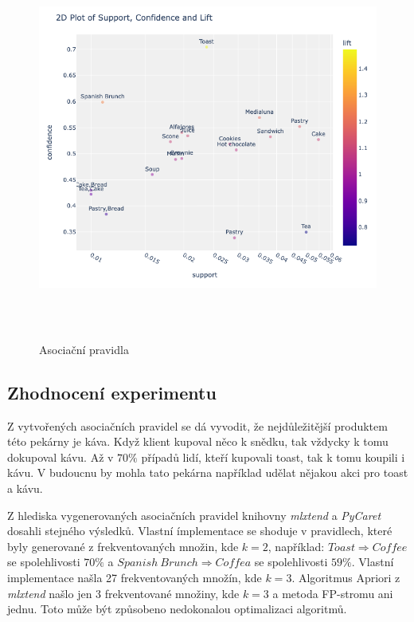 \begin{figure}[h]\centering
  \centering
  \includegraphics[width=\linewidth,height=4.7in]{obrazky/newplot2.png}\\[1pt]
  \caption{Asociační pravidla}
  \label{pravidla}
\end{figure}

\subsection*{Zhodnocení experimentu}
Z vytvořených asociačních pravidel se dá vyvodit, že nejdůležitější produktem této pekárny je káva. Když klient kupoval něco k snědku, tak vždycky k tomu dokupoval kávu. Až v $70\%$ případů lidí, kteří kupovali toast, tak k tomu koupili i kávu. V budoucnu by mohla tato pekárna například udělat nějakou akci pro toast a kávu. 

Z hlediska vygenerovaných asociačních pravidel knihovny \textit{mlxtend} a \textit{PyCaret} dosahli stejného výsledků. Vlastní ímplementace se shoduje v pravidlech, které byly generované z frekventovaných množin, kde $k=2$, například: $Toast \Rightarrow Coffee$ se spolehlivosti $70\%$ a $Spanish\ Brunch \Rightarrow Coffea$ se spolehlivosti $59\%$. Vlastní implementace našla 27 frekventovaných množín, kde $k=3$. Algoritmus Apriori z \textit{mlxtend} našlo jen 3 frekventované množiny, kde $k=3$ a metoda FP-stromu ani jednu. Toto může být způsobeno nedokonalou optimalizaci algoritmů. 

